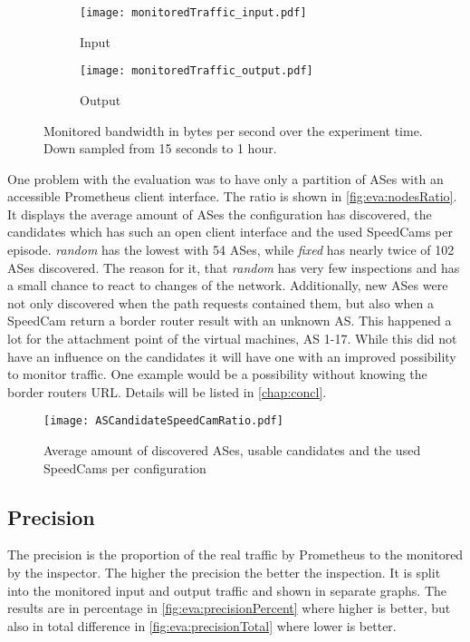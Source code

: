 \documentclass[thesis.tex]{subfiles}
\begin{document}
\begin{figure}[h]
	\centering
	\begin{subfigure}{.48\linewidth}
		\centering
		\texttt{[image: monitoredTraffic\_input.pdf]}
		\caption{Input}
		\label{fig:eva:monitoredTraffic:input}
	\end{subfigure}
	\hfill
	\begin{subfigure}{0.48\linewidth}
		\centering
		\texttt{[image: monitoredTraffic\_output.pdf]}
		\caption{Output}
		\label{fig:eva:monitoredTraffic:output}
	\end{subfigure}
	\caption{Monitored bandwidth in bytes per second over the experiment time. Down sampled from 15 seconds to 1 hour.}
	\label{fig:eva:monitoredTraffic}
\end{figure}

One problem with the evaluation was to have only a partition of ASes with an accessible Prometheus client interface. The ratio is shown in \autoref{fig:eva:nodesRatio}. It displays the average amount of ASes the configuration has discovered, the candidates which has such an open client interface and the used SpeedCams per episode. \textit{random} has the lowest with 54 ASes, while \textit{fixed} has nearly twice of 102 ASes discovered. The reason for it, that \textit{random} has very few inspections and has a small chance to react to changes of the network. Additionally, new ASes were not only discovered when the path requests contained them, but also when a SpeedCam return a border router result with an unknown AS. This happened a lot for the attachment point of the virtual machines, AS 1-17. While this did not have an influence on the candidates it will have one with an improved possibility to monitor traffic. One example would be a possibility without knowing the border routers URL. Details will be listed in \autoref{chap:concl}.

\begin{figure}[h]
	\centering
	\texttt{[image: ASCandidateSpeedCamRatio.pdf]}
	\caption{Average amount of discovered ASes, usable candidates and the used SpeedCams per configuration}
	\label{fig:eva:nodesRatio}
\end{figure}

\subsection{Precision} \label{sec:eva:precision}

The precision is the proportion of the real traffic by Prometheus to the monitored by the inspector. The higher the precision the better the inspection. It is split into the monitored input and output traffic and shown in separate graphs. The results are in percentage in \autoref{fig:eva:precisionPercent} where higher is better, but also in total difference in \autoref{fig:eva:precisionTotal} where lower is better.
\end{document}

